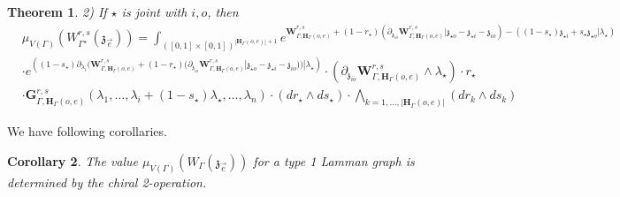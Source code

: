 \documentclass[11pt]{amsart}
\newtheorem{thm}{Theorem}[section]
\newtheorem{cor}[thm]{Corollary}
\theoremstyle{definition}
\theoremstyle{remark}
\numberwithin{equation}{section}
\begin{document}
\begin{thm}
  2) If $\star$ is joint with $i,o$, then
\begin{align*}
& \mu_{V(\Gamma)}\left(W^{r,s}_{\Gamma^{\star}}(\mathfrak{z}_{\vec{e}})\right)  = \int_{([0,1]\times[0,1])^{|\mathbf{H}_{\Gamma}(o,e)|+1}} e^{\mathbf{W}^{r,s}_{\Gamma,\mathbf{H}_{\Gamma}(o,e)}+(1-r_{\star})\left(\partial_{\mathfrak{z}_{io}}\mathbf{W}^{r,s}_{\Gamma,\mathbf{H}_{\Gamma}(o,e)}|\mathfrak{z}_{\star o}-\mathfrak{z}_{\star i}-\mathfrak{z}_{io}\right)-\left((1-s_{\star})\mathfrak{z}_{\star i}+s_{\star}\mathfrak{z}_{\star o}|\lambda_{\star}\right)} \\
   & \cdot e^{\left((1-s_{\star})\partial_{\lambda_i}(\mathbf{W}^{r,s}_{\Gamma,\mathbf{H}_{\Gamma}(o,e)}+(1-r_{\star})(\partial_{\mathfrak{z}_{io}}\mathbf{W}^{r,s}_{\Gamma,\mathbf{H}_{\Gamma}(o,e)}|\mathfrak{z}_{\star o}-\mathfrak{z}_{\star i}-\mathfrak{z}_{io}))|\lambda_{\star}\right)}\cdot \left(\partial_{\mathfrak{z}_{io}}\mathbf{W}^{r,s}_{\Gamma,\mathbf{H}_{\Gamma}(o,e)}\wedge\lambda_{\star}\right)\cdot r_{\star}\\
   &\cdot  \mathbf{G}^{r,s}_{\Gamma,\mathbf{H}_{\Gamma}(o,e)}(\lambda_1,\dots,\lambda_i+(1-s_{\star})\lambda_{\star},\dots,\lambda_{n})\cdot (dr_{\star}\wedge ds_{\star})\cdot \bigwedge_{k=1,\dots,|\mathbf{H}_{\Gamma}(o,e)|} (dr_k\wedge ds_k)
\end{align*}
\end{thm}


We have following corollaries.
\begin{cor}
  The value $\mu_{V(\Gamma)}\left(W_{\Gamma}(\mathfrak{z}_{\vec{e}})\right)$ for a type 1 Lamman graph is determined by the chiral 2-operation.
\end{cor}
\end{document}

